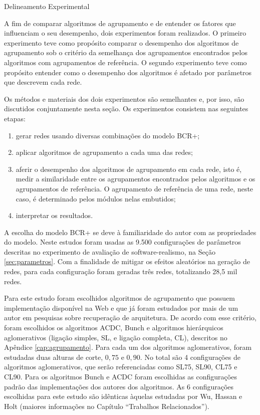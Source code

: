 \begin{section}{Delineamento Experimental}
	
	A fim de comparar algoritmos de agrupamento e de entender os fatores que influenciam o seu desempenho, dois experimentos foram realizados. O primeiro experimento teve como propósito comparar o desempenho dos algoritmos de agrupamento sob o critério da semelhança dos agrupamentos encontrados pelos algoritmos com agrupamentos de referência. O segundo experimento teve como propósito entender como o desempenho dos algoritmos é afetado por parâmetros que descrevem cada rede.
	
	Os métodos e materiais dos dois experimentos são semelhantes e, por isso, são discutidos conjuntamente nesta seção. Os experimentos consistem nas seguintes etapas: 
\begin{enumerate}
	\item gerar redes usando diversas combinações do modelo BCR+;
	\item aplicar algoritmos de agrupamento a cada uma das redes;
	\item aferir o desempenho dos algoritmos de agrupamento em cada rede, isto é, medir a similaridade entre os agrupamentos encontrados pelos algoritmos e os agrupamentos de referência. O agrupamento de referência de uma rede, neste caso, é determinado pelos módulos nelas embutidos;
	\item interpretar os resultados.
\end{enumerate}

	A escolha do modelo BCR+ se deve à familiaridade do autor com as propriedades do modelo. Neste estudos foram usadas as 9.500 configurações de parâmetros descritas no experimento de avaliação de software-realismo, na Seção \ref{sec:parametros}. Com a finalidade de mitigar os efeitos aleatórios na geração de redes, para cada configuração foram geradas três redes, totalizando 28,5 mil redes.

	Para este estudo foram escolhidos algoritmos de agrupamento que possuem implementação disponível na Web e que já foram estudados por mais de um autor em pesquisas sobre recuperação de arquitetura. De acordo com esse critério, foram escolhidos os algoritmos ACDC, Bunch e algoritmos hierárquicos aglomerativos (ligação simples, SL, e ligação completa, CL), descritos no Apêndice \ref{cap:agrupamento}. Para cada um dos algoritmos aglomerativos, foram estudadas duas alturas de corte, $0,75$ e $0,90$. No total são 4 configurações de algoritmos aglomerativos, que serão referenciadas como SL75, SL90, CL75 e CL90. Para os algoritmos Bunch e ACDC foram escolhidas as configurações padrão das implementações dos autores dos algoritmos. As 6 configurações escolhidas para este estudo são idênticas àquelas estudadas por Wu, Hassan e Holt \cite{Wu2005} (maiores informações no Capítulo ``Trabalhos Relacionados'').
	

\end{section}
